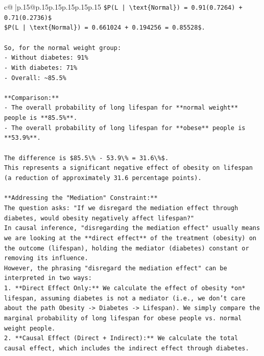 \documentclass{article}
\begin{document}
{\begin{supertabular}{c@{$\;$}|p{.15\linewidth}@{}p{.15\linewidth}p{.15\linewidth}p{.15\linewidth}p{.15\linewidth}p{.15\linewidth}}
{{{\texttt{\$P(L | \textbackslash{}text\{Normal\}) = 0.91(0.7264) + 0.71(0.2736)\$} \\
\texttt{\$P(L | \textbackslash{}text\{Normal\}) = 0.661024 + 0.194256 = 0.85528\$.} \\
\\ 
\texttt{So, for the normal weight group:} \\
\texttt{{-} Without diabetes: 91\%} \\
\texttt{{-} With diabetes: 71\%} \\
\texttt{{-} Overall: \textasciitilde{}85.5\%} \\
\\ 
\texttt{**Comparison:**} \\
\texttt{{-} The overall probability of long lifespan for **normal weight** people is **85.5\%**.} \\
\texttt{{-} The overall probability of long lifespan for **obese** people is **53.9\%**.} \\
\\ 
\texttt{The difference is \$85.5\textbackslash{}\% {-} 53.9\textbackslash{}\% = 31.6\textbackslash{}\%\$.} \\
\texttt{This represents a significant negative effect of obesity on lifespan (a reduction of approximately 31.6 percentage points).} \\
\\ 
\texttt{**Addressing the "Mediation" Constraint:**} \\
\texttt{The question asks: "If we disregard the mediation effect through diabetes, would obesity negatively affect lifespan?"} \\
\texttt{In causal inference, "disregarding the mediation effect" usually means we are looking at the **direct effect** of the treatment (obesity) on the outcome (lifespan), holding the mediator (diabetes) constant or removing its influence.} \\
\texttt{However, the phrasing "disregard the mediation effect" can be interpreted in two ways:} \\
\texttt{1.  **Direct Effect Only:** We calculate the effect of obesity *on* lifespan, assuming diabetes is not a mediator (i.e., we don't care about the path Obesity {-}> Diabetes {-}> Lifespan). We simply compare the marginal probability of long lifespan for obese people vs. normal weight people.} \\
\texttt{2.  **Causal Effect (Direct + Indirect):** We calculate the total causal effect, which includes the indirect effect through diabetes.} \\
}}}
\end{supertabular}}
\end{document}
